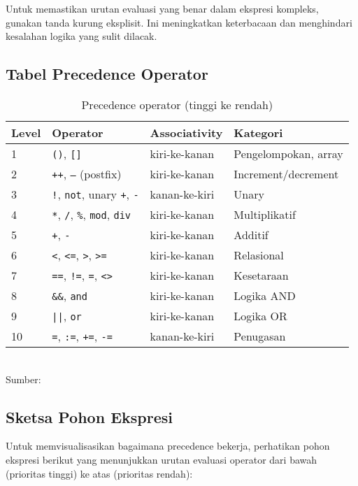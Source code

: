 \documentclass[../main.tex]{subfiles}
\begin{document}
Untuk memastikan urutan evaluasi yang benar dalam ekspresi kompleks, gunakan tanda kurung eksplisit. Ini meningkatkan keterbacaan dan menghindari kesalahan logika yang sulit dilacak.

\subsection{Tabel Precedence Operator}
\begin{table}[H]
  \centering
  \caption{Precedence operator (tinggi ke rendah)}
  \begin{tabular}{@{}llll@{}}
    \toprule
    Level & Operator & Associativity & Kategori \\
    \midrule
    1 & \texttt{()}, \texttt{[]} & kiri-ke-kanan & Pengelompokan, array \\
    2 & \texttt{++}, \texttt{--} (postfix) & kiri-ke-kanan & Increment/decrement \\
    3 & \texttt{!}, \texttt{not}, unary \texttt{+}, \texttt{-} & kanan-ke-kiri & Unary \\
    4 & \texttt{*}, \texttt{/}, \texttt{\%}, \texttt{mod}, \texttt{div} & kiri-ke-kanan & Multiplikatif \\
    5 & \texttt{+}, \texttt{-} & kiri-ke-kanan & Additif \\
    6 & \texttt{<}, \texttt{<=}, \texttt{>}, \texttt{>=} & kiri-ke-kanan & Relasional \\
    7 & \texttt{==}, \texttt{!=}, \texttt{=}, \texttt{<>} & kiri-ke-kanan & Kesetaraan \\
    8 & \texttt{\&\&}, \texttt{and} & kiri-ke-kanan & Logika AND \\
    9 & \texttt{||}, \texttt{or} & kiri-ke-kanan & Logika OR \\
    10 & \texttt{=}, \texttt{:=}, \texttt{+=}, \texttt{-=} & kanan-ke-kiri & Penugasan \\
    \bottomrule
  \end{tabular}
  \\Sumber: \parencite{gnu-c-manual,cpp-op-precedence,c-op-precedence}
\end{table}

\subsection{Sketsa Pohon Ekspresi}
Untuk memvisualisasikan bagaimana precedence bekerja, perhatikan pohon ekspresi berikut yang menunjukkan urutan evaluasi operator dari bawah (prioritas tinggi) ke atas (prioritas rendah):
\end{document}
